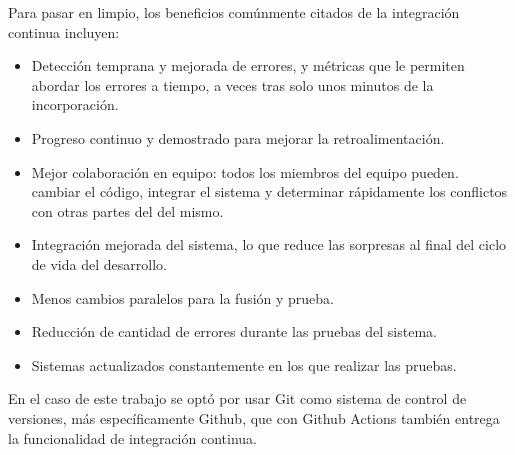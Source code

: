 Para pasar en limpio, los beneficios comúnmente citados de la integración
continua incluyen:
\begin{itemize}
  \item Detección temprana y mejorada de errores, y métricas que le permiten
  abordar los errores a tiempo, a veces tras solo unos minutos de la incorporación.
  \item Progreso continuo y demostrado para mejorar la retroalimentación.
  \item Mejor colaboración en equipo: todos los miembros del equipo pueden.
  cambiar el código, integrar el sistema y determinar rápidamente los conflictos
  con otras partes del del mismo.
  \item Integración mejorada del sistema, lo que reduce las sorpresas al final
  del ciclo de vida del desarrollo.
  \item Menos cambios paralelos para la fusión y prueba.
  \item Reducción de cantidad de errores durante las pruebas del sistema.
  \item Sistemas actualizados constantemente en los que realizar las pruebas.
\end{itemize}

En el caso de este trabajo se optó por usar Git como sistema de control de
versiones, más específicamente Github, que con Github Actions también entrega
la funcionalidad de integración continua.